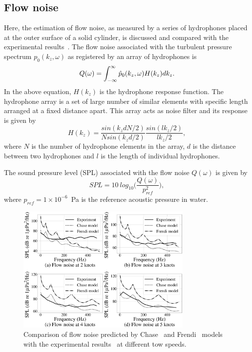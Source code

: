 \documentclass[11pt,cleanfoot]{asme2ej}
\begin{document}
\subsection{Flow noise} \label{sec:flownoise}
Here, the estimation of flow noise, as measured by a series of hydrophones placed at the outer surface of a solid cylinder, is discussed and compared with the experimental results~\cite{Unni2011}.
The flow noise associated with the turbulent pressure spectrum $p_{0}(k_{z},\omega)$ as registered by an array of hydrophones is~\cite{Unni2011} 
\begin{equation}\label{Flow noise equaton from Unni}
    Q(\omega) = \int_{-\infty}^{\infty} \Hat{p}_{0}(k_{z},\omega)H(k_{z})dk_{z}.
\end{equation}
In the above equation, $H(k_{z})$ is the hydrophone response function. The hydrophone array is a set of large number of similar elements with specific length arranged at a fixed distance apart. This array acts as noise filter and its response is given by \cite{Unni2011} 
\begin{equation}\label{Hydrophone response equation from Unni}
    H(k_{z}) = \frac{sin(k_{z}dN/2)}{Nsin(k_{z}d/2)}\frac{sin(lk_{z}/2)}{lk_{z}/2},
\end{equation}
where $N$ is the number of hydrophone elements in the array, $d$ is the distance between two hydrophones and $l$ is the length of individual hydrophones.

The sound pressure level (SPL) associated with the flow noise $Q(\omega)$ is given by
\begin{equation}\label{SPL outside noise}
SPL = 10~log_{10}\bigg(\frac{Q(\omega)}{p_{ref}^2}\bigg),
\end{equation}
where $p_{ref} = 1\times10^{-6}$~Pa is the reference acoustic pressure in water. 


\begin{figure}
    \centering
    \includegraphics[width=3.4in]{Chase,frendi_vs_Unni_comparison.eps}
    \caption{Comparison of flow noise predicted by Chase~\cite{Chase1981} and Frendi~\cite{frendi2020} models with the experimental results~\cite{Unni2011} at different tow speeds.}
    \label{Chase,frendi,expt}
\end{figure}
 
\end{document}
